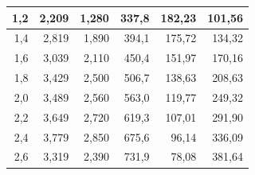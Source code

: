 \begin{enumerate}
\begin{table}[h!]
{\begin{tabular}{|r|r|r|r|r|r|}
					1,2                          & 2,209                              & 1,280                                          & 337,8                                       & 182,23                                                                                           & 101,56                        \\ \hline
					1,4                          & 2,819                              & 1,890                                          & 394,1                                       & 175,72                                                                                           & 134,32                        \\ \hline
					1,6                          & 3,039                              & 2,110                                          & 450,4                                       & 151,97                                                                                           & 170,16                        \\ \hline
					1,8                          & 3,429                              & 2,500                                           & 506,7                                       & 138,63                                                                                           & 208,63                        \\ \hline
					2,0                          & 3,489                              & 2,560                                          & 563,0                                       & 119,77                                                                                           & 249,32                        \\ \hline
					2,2                          & 3,649                              & 2,720                                          & 619,3                                       & 107,01                                                                                           & 291,90                        \\ \hline
					2,4                          & 3,779                              & 2,850                                          & 675,6                                       & 96,14                                                                                            & 336,09                        \\ \hline
					2,6                          & 3,319                              & 2,390                                          & 731,9                                       & 78,08                                                                                           & 381,64                        \\ \hline

\end{tabular}}
\end{table}
\end{enumerate}
